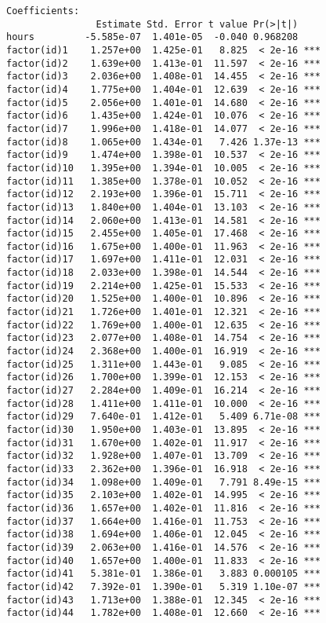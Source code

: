 \documentclass[]{article}
\begin{document}
\begin{verbatim}
Coefficients:
                Estimate Std. Error t value Pr(>|t|)    
hours         -5.585e-07  1.401e-05  -0.040 0.968208    
factor(id)1    1.257e+00  1.425e-01   8.825  < 2e-16 ***
factor(id)2    1.639e+00  1.413e-01  11.597  < 2e-16 ***
factor(id)3    2.036e+00  1.408e-01  14.455  < 2e-16 ***
factor(id)4    1.775e+00  1.404e-01  12.639  < 2e-16 ***
factor(id)5    2.056e+00  1.401e-01  14.680  < 2e-16 ***
factor(id)6    1.435e+00  1.424e-01  10.076  < 2e-16 ***
factor(id)7    1.996e+00  1.418e-01  14.077  < 2e-16 ***
factor(id)8    1.065e+00  1.434e-01   7.426 1.37e-13 ***
factor(id)9    1.474e+00  1.398e-01  10.537  < 2e-16 ***
factor(id)10   1.395e+00  1.394e-01  10.005  < 2e-16 ***
factor(id)11   1.385e+00  1.378e-01  10.052  < 2e-16 ***
factor(id)12   2.193e+00  1.396e-01  15.711  < 2e-16 ***
factor(id)13   1.840e+00  1.404e-01  13.103  < 2e-16 ***
factor(id)14   2.060e+00  1.413e-01  14.581  < 2e-16 ***
factor(id)15   2.455e+00  1.405e-01  17.468  < 2e-16 ***
factor(id)16   1.675e+00  1.400e-01  11.963  < 2e-16 ***
factor(id)17   1.697e+00  1.411e-01  12.031  < 2e-16 ***
factor(id)18   2.033e+00  1.398e-01  14.544  < 2e-16 ***
factor(id)19   2.214e+00  1.425e-01  15.533  < 2e-16 ***
factor(id)20   1.525e+00  1.400e-01  10.896  < 2e-16 ***
factor(id)21   1.726e+00  1.401e-01  12.321  < 2e-16 ***
factor(id)22   1.769e+00  1.400e-01  12.635  < 2e-16 ***
factor(id)23   2.077e+00  1.408e-01  14.754  < 2e-16 ***
factor(id)24   2.368e+00  1.400e-01  16.919  < 2e-16 ***
factor(id)25   1.311e+00  1.443e-01   9.085  < 2e-16 ***
factor(id)26   1.700e+00  1.399e-01  12.153  < 2e-16 ***
factor(id)27   2.284e+00  1.409e-01  16.214  < 2e-16 ***
factor(id)28   1.411e+00  1.411e-01  10.000  < 2e-16 ***
factor(id)29   7.640e-01  1.412e-01   5.409 6.71e-08 ***
factor(id)30   1.950e+00  1.403e-01  13.895  < 2e-16 ***
factor(id)31   1.670e+00  1.402e-01  11.917  < 2e-16 ***
factor(id)32   1.928e+00  1.407e-01  13.709  < 2e-16 ***
factor(id)33   2.362e+00  1.396e-01  16.918  < 2e-16 ***
factor(id)34   1.098e+00  1.409e-01   7.791 8.49e-15 ***
factor(id)35   2.103e+00  1.402e-01  14.995  < 2e-16 ***
factor(id)36   1.657e+00  1.402e-01  11.816  < 2e-16 ***
factor(id)37   1.664e+00  1.416e-01  11.753  < 2e-16 ***
factor(id)38   1.694e+00  1.406e-01  12.045  < 2e-16 ***
factor(id)39   2.063e+00  1.416e-01  14.576  < 2e-16 ***
factor(id)40   1.657e+00  1.400e-01  11.833  < 2e-16 ***
factor(id)41   5.381e-01  1.386e-01   3.883 0.000105 ***
factor(id)42   7.392e-01  1.390e-01   5.319 1.10e-07 ***
factor(id)43   1.713e+00  1.388e-01  12.345  < 2e-16 ***
factor(id)44   1.782e+00  1.408e-01  12.660  < 2e-16 ***

\end{verbatim}
\end{document}
